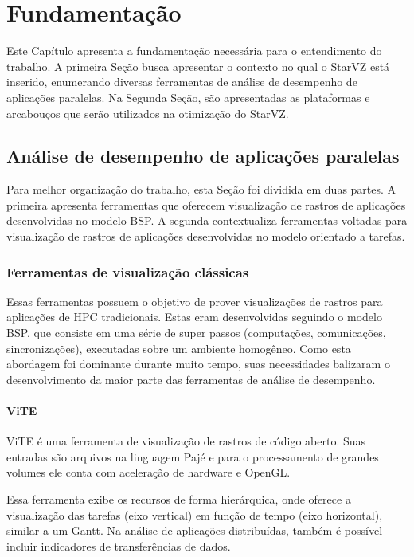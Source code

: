 
\chapter{Fundamentação} \label{ch:fundamentation}

Este Capítulo apresenta a fundamentação necessária para o entendimento do 
trabalho. A primeira Seção busca apresentar o contexto no qual o StarVZ está 
inserido, enumerando diversas ferramentas de análise de desempenho de aplicações 
paralelas. Na Segunda Seção, são apresentadas as plataformas e arcabouços que 
serão utilizados na otimização do StarVZ.


\section{Análise de desempenho de aplicações paralelas}

Para melhor organização do trabalho, esta Seção foi dividida em duas partes. A 
primeira apresenta ferramentas que oferecem visualização de rastros de 
aplicações desenvolvidas no modelo BSP. A segunda contextualiza ferramentas 
voltadas para visualização de rastros de aplicações desenvolvidas no modelo 
orientado a tarefas.

\subsection{Ferramentas de visualização clássicas}

Essas ferramentas possuem o objetivo de prover visualizações de rastros para 
aplicações de HPC tradicionais. Estas eram desenvolvidas seguindo o modelo 
BSP, que consiste em uma série de super passos (computações, comunicações, 
sincronizações), executadas sobre um ambiente homogêneo. Como esta abordagem  
foi dominante durante muito tempo, suas necessidades balizaram 
o desenvolvimento da maior parte das ferramentas de análise de desempenho.

\subsubsection*{ViTE}
ViTE \cite{ref:vite} é uma ferramenta de visualização de rastros de código 
aberto. Suas entradas são arquivos na linguagem Pajé \cite{ref:paje} e para o 
processamento de grandes volumes ele conta com aceleração de hardware e 
OpenGL. 

Essa ferramenta exibe os recursos de forma hierárquica, onde oferece a 
visualização das tarefas (eixo vertical) em função de tempo (eixo horizontal), 
similar a um Gantt. Na análise de aplicações distribuídas, também é possível 
incluir indicadores de transferências de dados.

